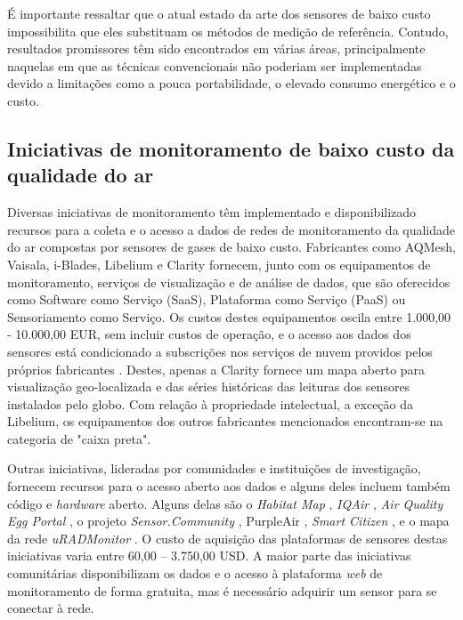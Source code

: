 É importante ressaltar que o atual estado da arte dos sensores de baixo custo impossibilita que eles substituam os métodos de medição de referência. Contudo, resultados promissores têm sido encontrados em várias áreas, principalmente naquelas em que as técnicas convencionais não poderiam ser implementadas devido a limitações como a pouca portabilidade, o elevado consumo energético e o custo.

\subsection{Iniciativas de monitoramento de baixo custo da qualidade do ar}

Diversas iniciativas de monitoramento têm implementado e disponibilizado recursos para a coleta e o acesso a dados de redes de monitoramento da qualidade do ar compostas por sensores de gases de baixo custo. Fabricantes como AQMesh, Vaisala, i-Blades, Libelium e Clarity fornecem, junto com os equipamentos de monitoramento, serviços de visualização e de análise de dados, que são oferecidos como Software como Serviço (SaaS), Plataforma como Serviço (PaaS) ou Sensoriamento como Serviço. Os custos destes equipamentos oscila entre 1.000,00 - 10.000,00 EUR, sem incluir custos de operação, e o acesso aos dados dos sensores está condicionado a subscrições nos serviços de nuvem providos pelos próprios fabricantes \cite{Karagulian2019ReviewMonitoring}. Destes, apenas a Clarity fornece um mapa aberto para visualização geo-localizada e das séries históricas das leituras dos sensores instalados pelo globo. Com relação à propriedade intelectual, a exceção da Libelium, os equipamentos dos outros fabricantes mencionados encontram-se na categoria de "caixa preta". 

Outras iniciativas, lideradas por comunidades e instituições de investigação, fornecem recursos para o acesso aberto aos dados e alguns deles incluem também código e \textit{hardware} aberto. Alguns delas são o \textit{Habitat Map} \cite{HabitatMap2023AirCasting}, \textit{IQAir} \cite{IQAir2023}, \textit{Air Quality Egg Portal} \cite{AirQualityEgg2023AirPortal}, o projeto \textit{Sensor.Community} \cite{Sensor.Community2023LuftMap}, PurpleAir \cite{PurpleAir2023PurpleAirMonitoring}, \textit{Smart Citizen} \cite{SmartCitizen2023SmartCitizen}, e o mapa da rede \textit{uRADMonitor} \cite{uRADMonitor2023PM2.5URADMonitor}. O custo de aquisição das plataformas de sensores destas iniciativas varia entre 60,00 – 3.750,00 USD. A maior parte das iniciativas comunitárias disponibilizam os dados e o acesso à plataforma \textit{web} de monitoramento de forma gratuita, mas é necessário adquirir um sensor para se conectar à rede.

